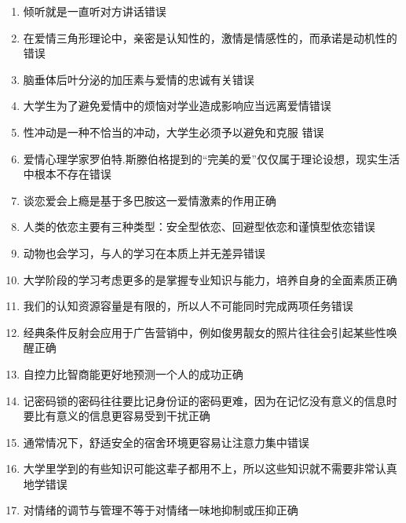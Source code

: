 \documentclass{article}
\begin{document}
\begin{enumerate}
		\item 倾听就是一直听对方讲话\hfill 错误
		
		\item 在爱情三角形理论中，亲密是认知性的，激情是情感性的，而承诺是动机性的\hfill 错误
		
		\item 脑垂体后叶分泌的加压素与爱情的忠诚有关\hfill 错误
		
		\item 大学生为了避免爱情中的烦恼对学业造成影响应当远离爱情\hfill 错误
		
		\item 性冲动是一种不恰当的冲动，大学生必须予以避免和克服\hfill 
		错误
		\item 爱情心理学家罗伯特.斯滕伯格提到的“完美的爱”仅仅属于理论设想，现实生活中根本不存在\hfill 错误
		
		\item 谈恋爱会上瘾是基于多巴胺这一爱情激素的作用\hfill 正确
		
		\item 人类的依恋主要有三种类型：安全型依恋、回避型依恋和谨慎型依恋\hfill 错误
		
		\item 动物也会学习，与人的学习在本质上并无差异\hfill 错误
		
		\item 大学阶段的学习考虑更多的是掌握专业知识与能力，培养自身的全面素质\hfill 正确
		
		\item 我们的认知资源容量是有限的，所以人不可能同时完成两项任务\hfill 错误
		
		\item 经典条件反射会应用于广告营销中，例如俊男靓女的照片往往会引起某些性唤醒\hfill 正确
		
		\item 自控力比智商能更好地预测一个人的成功\hfill 正确
		
		\item 记密码锁的密码往往要比记身份证的密码更难，因为在记忆没有意义的信息时要比有意义的信息更容易受到干扰\hfill 正确
		
		\item 通常情况下，舒适安全的宿舍环境更容易让注意力集中\hfill 错误
		
		\item 大学里学到的有些知识可能这辈子都用不上，所以这些知识就不需要非常认真地学\hfill 错误
		
		\item 对情绪的调节与管理不等于对情绪一味地抑制或压抑\hfill 正确
		

\end{enumerate}
\end{document}
